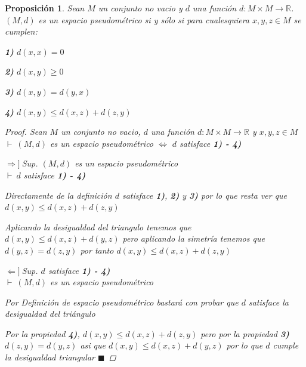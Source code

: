 \documentclass[oneside]{book} %
\theoremstyle{Teorema}
\newtheorem{Proposicion}[Definicion]{Proposición}
\theoremstyle{Ejemplos}
\theoremstyle{[Obs]}
\renewcommand{\{}{\left\lbrace} %
\renewcommand{\}}{\right\rbrace} %
\newcommand{\R}{\mathbb{R}} %
\renewcommand{\qed}{$\blacksquare$} %
\newcommand{\pd}{$\vdash\ $} %
\newcommand{\necesidad}{$\Rightarrow]\ $} %
\newcommand{\suficiencia}{$\Leftarrow]\ $} %
\begin{document}
			\begin{Proposicion}\setlength{\parindent}{0em}

				Sean $M$ un conjunto no vacio y $d$ una función $d : M \times M \to \R$. $(M, d)$ es un espacio pseudométrico si y sólo si para cualesquiera $x, y, z \in M$ se cumplen: 

				\textbf{1)} $d(x, x) = 0$ 

				\textbf{2)} $d(x, y) \geq 0$
				
				\textbf{3)} $d(x, y) = d(y, x)$ 

				\textbf{4)} $d(x, y) \leq d(x, z) + d(z, y)$

				\begin{proof}
					
					Sean $M$ un conjunto no vacio, $d$ una función $d : M \times M \to \R$ y $x, y, z \in M$ \\
					\pd $(M, d)$ es un espacio pseudométrico $\Leftrightarrow$ $d$ satisface \textbf{1) - 4)}

					\necesidad Sup. $(M, d)$ es un espacio pseudométrico \\
					\pd $d$ satisface \textbf{1) - 4)}

					Directamente de la definición $d$ satisface \textbf{1)}, \textbf{2)} y \textbf{3)} por lo que resta ver que $d(x, y) \leq d(x, z) + d(z, y)$
					
					Aplicando la desigualdad del triangulo tenemos que $d(x, y) \leq d(x, z) + d(y, z)$ pero aplicando la simetría tenemos que $d(y, z) = d(z, y)$ por tanto $d(x, y) \leq d(x, z) + d(z, y)$

					\suficiencia Sup. $d$ satisface \textbf{1) - 4)} \\
					\pd $(M, d)$ es un espacio pseudométrico

					Por Definición de espacio pseudométrico bastará con probar que $d$ satisface la desigualdad del triángulo
					
					Por la propiedad \textbf{4)}, $d(x, y) \leq d(x, z) + d(z, y)$ pero por la propiedad \textbf{3)} $d(z, y) = d(y, z)$ asi que $d(x, y) \leq d(x, z) + d(y, z)$ por lo que $d$ cumple la desigualdad triangular \qed

				\end{proof}

			\end{Proposicion}
\end{document}
